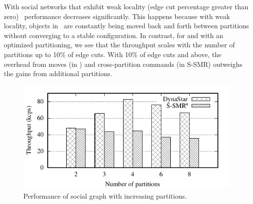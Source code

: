 With social networks that exhibit weak locality (edge cut percentage greater than zero) \dssmr\ performance decreases significantly.  
This happens because with weak locality, objects in \dssmr\ are constantly being moved back and forth between partitions 
without converging to a stable configuration.%
In contrast, for \dynastar and \ssmr with an optimized partitioning, we see that the throughput scales with the number of partitions up to 10\% of edge cuts. 
With 10\% of edge cuts and above, the overhead from moves (in \dynastar) and cross-partition commands (in S-SMR) outweighs the gains from additional partitions.

\begin{figure}[ht]
	\includegraphics[width=0.95\columnwidth]{figures/socc/socc-throughput-avg-vary-partition}
	\caption{Performance of social graph with increasing partitions.}
	\label{fig:4p1p_varying_partition_size}
\end{figure}

